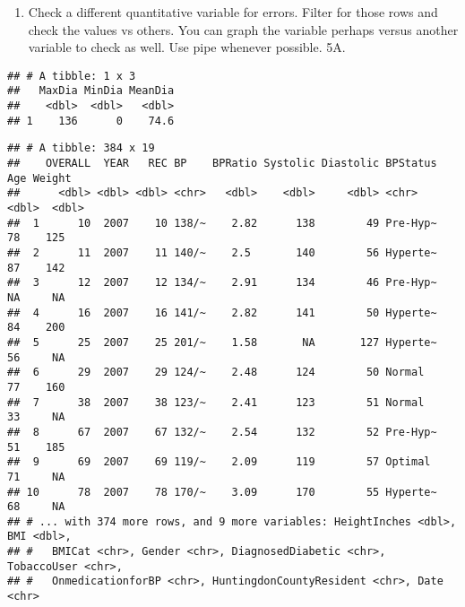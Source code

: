 \documentclass[
]{article}
\newenvironment{Shaded}{\begin{snugshade}}{\end{snugshade}}
\newcommand{\DataTypeTok}[1]{\textcolor[rgb]{0.13,0.29,0.53}{#1}}
\newcommand{\DecValTok}[1]{\textcolor[rgb]{0.00,0.00,0.81}{#1}}
\newcommand{\KeywordTok}[1]{\textcolor[rgb]{0.13,0.29,0.53}{\textbf{#1}}}
\newcommand{\NormalTok}[1]{#1}
\newcommand{\OperatorTok}[1]{\textcolor[rgb]{0.81,0.36,0.00}{\textbf{#1}}}
\newcommand{\OtherTok}[1]{\textcolor[rgb]{0.56,0.35,0.01}{#1}}
\newcommand{\StringTok}[1]{\textcolor[rgb]{0.31,0.60,0.02}{#1}}
\providecommand{\tightlist}{%
  \setlength{\itemsep}{0pt}\setlength{\parskip}{0pt}}
\begin{document}
\begin{enumerate}
\def\labelenumi{\arabic{enumi}.}
\setcounter{enumi}{4}
\tightlist
\item
  Check a different quantitative variable for errors. Filter for those
  rows and check the values vs others. You can graph the variable
  perhaps versus another variable to check as well. Use pipe whenever
  possible. 5A.
\end{enumerate}

\begin{Shaded}
\end{Shaded}

\begin{verbatim}
## # A tibble: 1 x 3
##   MaxDia MinDia MeanDia
##    <dbl>  <dbl>   <dbl>
## 1    136      0    74.6
\end{verbatim}

\begin{Shaded}
\end{Shaded}

\begin{verbatim}
## # A tibble: 384 x 19
##    OVERALL  YEAR   REC BP    BPRatio Systolic Diastolic BPStatus   Age Weight
##      <dbl> <dbl> <dbl> <chr>   <dbl>    <dbl>     <dbl> <chr>    <dbl>  <dbl>
##  1      10  2007    10 138/~    2.82      138        49 Pre-Hyp~    78    125
##  2      11  2007    11 140/~    2.5       140        56 Hyperte~    87    142
##  3      12  2007    12 134/~    2.91      134        46 Pre-Hyp~    NA     NA
##  4      16  2007    16 141/~    2.82      141        50 Hyperte~    84    200
##  5      25  2007    25 201/~    1.58       NA       127 Hyperte~    56     NA
##  6      29  2007    29 124/~    2.48      124        50 Normal      77    160
##  7      38  2007    38 123/~    2.41      123        51 Normal      33     NA
##  8      67  2007    67 132/~    2.54      132        52 Pre-Hyp~    51    185
##  9      69  2007    69 119/~    2.09      119        57 Optimal     71     NA
## 10      78  2007    78 170/~    3.09      170        55 Hyperte~    68     NA
## # ... with 374 more rows, and 9 more variables: HeightInches <dbl>, BMI <dbl>,
## #   BMICat <chr>, Gender <chr>, DiagnosedDiabetic <chr>, TobaccoUser <chr>,
## #   OnmedicationforBP <chr>, HuntingdonCountyResident <chr>, Date <chr>
\end{verbatim}
\end{document}
